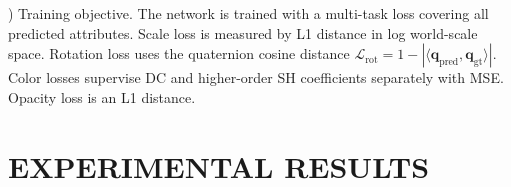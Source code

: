 \documentclass[letterpaper, 10pt, conference]{ieeeconf}
\begin{document}
\vspace{0.35em}
) Training objective. The network is trained with a multi-task loss covering all predicted attributes. Scale loss is measured by L1 distance in log world-scale space. Rotation loss uses the quaternion cosine distance $\mathcal{L}_{\text{rot}} = 1 - |\langle \mathbf{q}_{\text{pred}}, \mathbf{q}_{\text{gt}} \rangle|$. Color losses supervise DC and higher-order SH coefficients separately with MSE. Opacity loss is an L1 distance.


\section{EXPERIMENTAL RESULTS}
\end{document}
